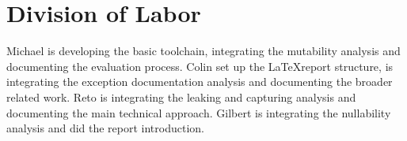 
\section{Division of Labor}

Michael is developing the basic toolchain, integrating the mutability analysis
and documenting the evaluation process. Colin set up the \LaTeX report
structure, is integrating the exception documentation analysis and documenting
the broader related work. Reto is integrating the leaking and capturing
analysis and documenting the main technical approach. Gilbert is integrating
the nullability analysis and did the report introduction.
